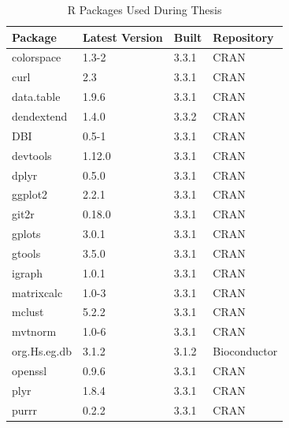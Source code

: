 \begin{longtable}{|llll|}
\caption{R Packages Used During Thesis}
\label{tab:computers_r_packages}
\\
\multicolumn{1}{l}{Package}      & \multicolumn{1}{l}{Latest Version} & \multicolumn{1}{l}{Built} & \multicolumn{1}{l}{Repository}      \\ \hline  \rowcolor{gray!25}
colorspace   & 1.3-2          & 3.3.1 & CRAN            \\ \hline
curl         & 2.3            & 3.3.1 & CRAN            \\ \hline  \rowcolor{gray!25}
data.table   & 1.9.6          & 3.3.1 & CRAN            \\ \hline
dendextend   & 1.4.0          & 3.3.2 & CRAN            \\ \hline  \rowcolor{gray!25}
DBI          & 0.5-1          & 3.3.1 & CRAN            \\ \hline
devtools     & 1.12.0         & 3.3.1 & CRAN            \\ \hline  \rowcolor{gray!25}
dplyr        & 0.5.0          & 3.3.1 & CRAN            \\ \hline
ggplot2      & 2.2.1          & 3.3.1 & CRAN            \\ \hline  \rowcolor{gray!25}
git2r        & 0.18.0         & 3.3.1 & CRAN            \\ \hline
gplots       & 3.0.1          & 3.3.1 & CRAN            \\ \hline  \rowcolor{gray!25}
gtools       & 3.5.0          & 3.3.1 & CRAN            \\ \hline
igraph       & 1.0.1          & 3.3.1 & CRAN            \\ \hline  \rowcolor{gray!25}
matrixcalc   & 1.0-3          & 3.3.1 & CRAN            \\ \hline
mclust       & 5.2.2          & 3.3.1 & CRAN            \\ \hline  \rowcolor{gray!25}
mvtnorm      & 1.0-6          & 3.3.1 & CRAN            \\ \hline
org.Hs.eg.db & 3.1.2          & 3.1.2 & Bioconductor    \\ \hline  \rowcolor{gray!25}
openssl      & 0.9.6          & 3.3.1 & CRAN            \\ \hline
plyr         & 1.8.4          & 3.3.1 & CRAN            \\ \hline  \rowcolor{gray!25}
purrr        & 0.2.2          & 3.3.1 & CRAN            \\ \hline

\end{longtable}
